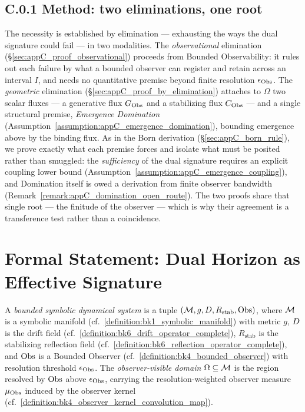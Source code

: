 \subsection*{C.0.1 Method: two eliminations, one root} \label{subsec:appC_methodological_logical_framework}
The necessity is established by elimination --- exhausting the ways the dual signature could fail --- in two modalities. The \emph{observational} elimination (\S\ref{sec:appC_proof_observational}) proceeds from Bounded Observability: it rules out each failure by what a bounded observer can register and retain across an interval \(I\), and needs no quantitative premise beyond finite resolution \(\epsilon_{\mathrm{Obs}}\). The \emph{geometric} elimination (\S\ref{sec:appC_proof_by_elimination}) attaches to \(\Omega\) two scalar fluxes --- a generative flux \(G_{\mathrm{Obs}}\) and a stabilizing flux \(C_{\mathrm{Obs}}\) --- and a single structural premise, \emph{Emergence Domination} (Assumption~\ref{assumption:appC_emergence_domination}), bounding emergence above by the binding flux. As in the Born derivation (\S\ref{sec:appC_born_rule}), we prove exactly what each premise forces and isolate what must be posited rather than smuggled: the \emph{sufficiency} of the dual signature requires an explicit coupling lower bound (Assumption~\ref{assumption:appC_emergence_coupling}), and Domination itself is owed a derivation from finite observer bandwidth (Remark~\ref{remark:appC_domination_open_route}). The two proofs share that single root --- the finitude of the observer --- which is why their agreement is a transference test rather than a coincidence.

\section{Formal Statement: Dual Horizon as Effective Signature} \label{sec:appC_formal_statement_dual_horizon_thesis}

\begin{definition}
\label{definition:appC_observer_visible_system}
A \emph{bounded symbolic dynamical system} is a tuple
\((\mathcal{M}, g, D, R_{\mathrm{stab}}, \mathrm{Obs})\), where \(\mathcal{M}\) is a
symbolic manifold (cf.~\ref{definition:bk1_symbolic_manifold}) with metric \(g\),
\(D\) is the drift field (cf.~\ref{definition:bk6_drift_operator_complete}),
\(R_{\mathrm{stab}}\) is the stabilizing reflection field
(cf.~\ref{definition:bk6_reflection_operator_complete}), and \(\mathrm{Obs}\) is a Bounded
Observer (cf.~\ref{definition:bk4_bounded_observer}) with resolution threshold
\(\epsilon_{\mathrm{Obs}}\). The \emph{observer-visible domain} \(\Omega\subseteq\mathcal{M}\)
is the region resolved by \(\mathrm{Obs}\) above \(\epsilon_{\mathrm{Obs}}\), carrying the
resolution-weighted observer measure \(\mu_{\mathrm{Obs}}\) induced by the observer kernel
(cf.~\ref{definition:bk4_observer_kernel_convolution_map}).
\end{definition}

